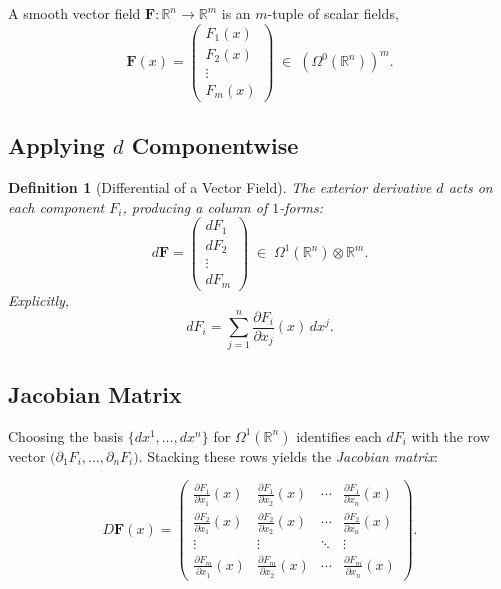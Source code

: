 \documentclass[12pt]{article}
\theoremstyle{definitionstyle}
\newtheorem{definition}{Definition} %
\newcommand{\R}{\mathbb{R}}
\begin{document}
	A smooth vector field 
	\(\mathbf F:\R^n\to\R^m\)
	is an \(m\)-tuple of scalar fields,
	\[
	\mathbf F(x)
	=\begin{pmatrix}F_1(x)\\F_2(x)\\\vdots\\F_m(x)\end{pmatrix}
	\;\in\;(\Omega^0(\R^n))^m.
	\]
	
	\subsection{Applying \(d\) Componentwise}
	
	\begin{definition}[Differential of a Vector Field]
		The exterior derivative \(d\) acts on each component \(F_i\), producing a column of \(1\)-forms:
		\[
		d\mathbf F
		=\begin{pmatrix}dF_1\\dF_2\\\vdots\\dF_m\end{pmatrix}
		\;\in\;\Omega^1(\R^n)\otimes\R^m.
		\]
		Explicitly,
		\[
		dF_i
		=\sum_{j=1}^n \frac{\partial F_i}{\partial x_j}(x)\,dx^j.
		\]
	\end{definition}
	
	\subsection{Jacobian Matrix}
	
	Choosing the basis \(\{dx^1,\dots,dx^n\}\) for \(\Omega^1(\R^n)\) identifies each \(dF_i\) with the row vector
	\(\bigl(\partial_1F_i,\dots,\partial_nF_i\bigr)\).  Stacking these rows yields the \emph{Jacobian matrix}:
	
	\[
	D\mathbf F(x)
	=\begin{pmatrix}
		\displaystyle \frac{\partial F_1}{\partial x_1}(x)
		&\displaystyle \frac{\partial F_1}{\partial x_2}(x)
		&\cdots
		&\displaystyle \frac{\partial F_1}{\partial x_n}(x)\\[10pt]
		\displaystyle \frac{\partial F_2}{\partial x_1}(x)
		&\displaystyle \frac{\partial F_2}{\partial x_2}(x)
		&\cdots
		&\displaystyle \frac{\partial F_2}{\partial x_n}(x)\\[10pt]
		\vdots & \vdots & \ddots & \vdots\\[6pt]
		\displaystyle \frac{\partial F_m}{\partial x_1}(x)
		&\displaystyle \frac{\partial F_m}{\partial x_2}(x)
		&\cdots
		&\displaystyle \frac{\partial F_m}{\partial x_n}(x)
	\end{pmatrix}.
	\]
	
\end{document}
